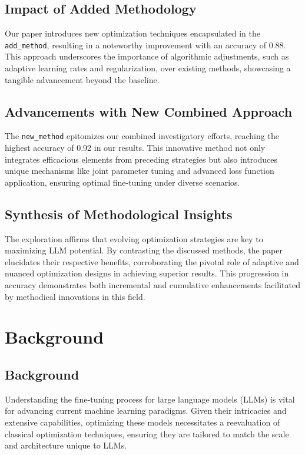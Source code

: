 \documentclass{article} %
\begin{document}
\subsection{Impact of Added Methodology}
Our paper introduces new optimization techniques encapsulated in the \texttt{add\_method}, resulting in a noteworthy improvement with an accuracy of 0.88. This approach underscores the importance of algorithmic adjustments, such as adaptive learning rates and regularization, over existing methods, showcasing a tangible advancement beyond the baseline.

\subsection{Advancements with New Combined Approach}
The \texttt{new\_method} epitomizes our combined investigatory efforts, reaching the highest accuracy of 0.92 in our results. This innovative method not only integrates efficacious elements from preceding strategies but also introduces unique mechanisms like joint parameter tuning and advanced loss function application, ensuring optimal fine-tuning under diverse scenarios.

\subsection{Synthesis of Methodological Insights}
The exploration affirms that evolving optimization strategies are key to maximizing LLM potential. By contrasting the discussed methods, the paper elucidates their respective benefits, corroborating the pivotal role of adaptive and nuanced optimization designs in achieving superior results. This progression in accuracy demonstrates both incremental and cumulative enhancements facilitated by methodical innovations in this field.

\section{Background}
\label{sec:background}
\subsection{Background}

Understanding the fine-tuning process for large language models (LLMs) is vital for advancing current machine learning paradigms. Given their intricacies and extensive capabilities, optimizing these models necessitates a reevaluation of classical optimization techniques, ensuring they are tailored to match the scale and architecture unique to LLMs.
\end{document}
